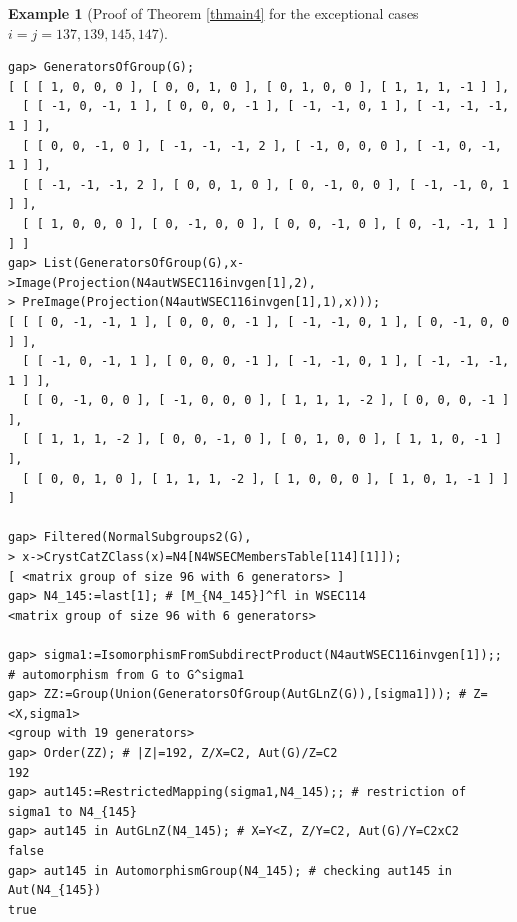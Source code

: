 \documentclass{amsart}
\theoremstyle{plain}
\theoremstyle{definition}
\newtheorem{example}[theorem]{Example}
\theoremstyle{remark}
\begin{document}
\begin{example}[Proof of {Theorem \ref{thmain4}} for the exceptional cases $i=j=137,139,145,147$]
\begin{verbatim}
gap> GeneratorsOfGroup(G);
[ [ [ 1, 0, 0, 0 ], [ 0, 0, 1, 0 ], [ 0, 1, 0, 0 ], [ 1, 1, 1, -1 ] ], 
  [ [ -1, 0, -1, 1 ], [ 0, 0, 0, -1 ], [ -1, -1, 0, 1 ], [ -1, -1, -1, 1 ] ], 
  [ [ 0, 0, -1, 0 ], [ -1, -1, -1, 2 ], [ -1, 0, 0, 0 ], [ -1, 0, -1, 1 ] ], 
  [ [ -1, -1, -1, 2 ], [ 0, 0, 1, 0 ], [ 0, -1, 0, 0 ], [ -1, -1, 0, 1 ] ], 
  [ [ 1, 0, 0, 0 ], [ 0, -1, 0, 0 ], [ 0, 0, -1, 0 ], [ 0, -1, -1, 1 ] ] ]
gap> List(GeneratorsOfGroup(G),x->Image(Projection(N4autWSEC116invgen[1],2),
> PreImage(Projection(N4autWSEC116invgen[1],1),x)));
[ [ [ 0, -1, -1, 1 ], [ 0, 0, 0, -1 ], [ -1, -1, 0, 1 ], [ 0, -1, 0, 0 ] ], 
  [ [ -1, 0, -1, 1 ], [ 0, 0, 0, -1 ], [ -1, -1, 0, 1 ], [ -1, -1, -1, 1 ] ], 
  [ [ 0, -1, 0, 0 ], [ -1, 0, 0, 0 ], [ 1, 1, 1, -2 ], [ 0, 0, 0, -1 ] ], 
  [ [ 1, 1, 1, -2 ], [ 0, 0, -1, 0 ], [ 0, 1, 0, 0 ], [ 1, 1, 0, -1 ] ], 
  [ [ 0, 0, 1, 0 ], [ 1, 1, 1, -2 ], [ 1, 0, 0, 0 ], [ 1, 0, 1, -1 ] ] ]

gap> Filtered(NormalSubgroups2(G),
> x->CrystCatZClass(x)=N4[N4WSECMembersTable[114][1]]);
[ <matrix group of size 96 with 6 generators> ]
gap> N4_145:=last[1]; # [M_{N4_145}]^fl in WSEC114
<matrix group of size 96 with 6 generators>

gap> sigma1:=IsomorphismFromSubdirectProduct(N4autWSEC116invgen[1]);; 
# automorphism from G to G^sigma1
gap> ZZ:=Group(Union(GeneratorsOfGroup(AutGLnZ(G)),[sigma1])); # Z=<X,sigma1>
<group with 19 generators>
gap> Order(ZZ); # |Z|=192, Z/X=C2, Aut(G)/Z=C2
192
gap> aut145:=RestrictedMapping(sigma1,N4_145);; # restriction of sigma1 to N4_{145}
gap> aut145 in AutGLnZ(N4_145); # X=Y<Z, Z/Y=C2, Aut(G)/Y=C2xC2
false
gap> aut145 in AutomorphismGroup(N4_145); # checking aut145 in Aut(N4_{145})
true
\end{verbatim}
\end{example}
\end{document}
